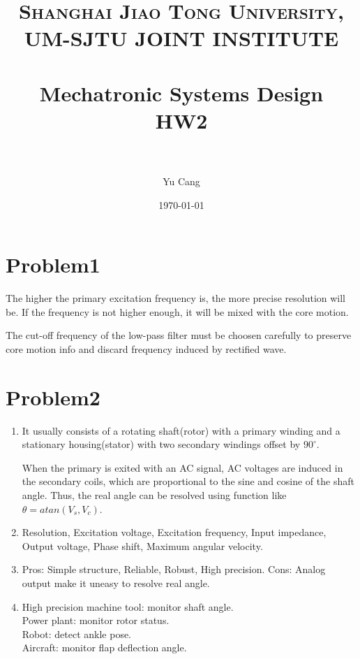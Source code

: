 \documentclass[paper=a4, fontsize=11pt]{scrartcl} %
\title{	
\normalfont \normalsize 
\textsc{Shanghai Jiao Tong University, UM-SJTU JOINT INSTITUTE} \\ [25pt] %
\horrule{0.5pt} \\[0.4cm] %
\huge Mechatronic Systems Design\\ HW2 \\ %
\horrule{2pt} \\[0.5cm] %
}
\author{Yu Cang \quad 018370210001} %
\date{\normalsize \today} %
\numberwithin{equation}{section} %
\numberwithin{figure}{section} %
\numberwithin{table}{section} %
\begin{document}
\maketitle %

\section*{Problem1}
	The higher the primary excitation frequency is, the more precise resolution will be. If the frequency is not higher enough, it will be mixed with the core motion.\newline
	
	The cut-off frequency of the low-pass filter must be choosen carefully to preserve core motion info and discard frequency induced by rectified wave.

\section*{Problem2}
	\begin{enumerate}
		\item 
			It usually consists of a rotating shaft(rotor) with a primary winding and a stationary housing(stator) with two secondary windings offset by $90^\circ$. \newline
			
			When the primary is exited with an AC signal, AC voltages are induced in the secondary coils, which are proportional to the sine and cosine of the shaft angle. Thus, the real angle can be resolved using function like $\theta = atan(V_s, V_c)$.
			
		\item 
			Resolution, Excitation voltage, Excitation frequency, Input impedance, Output voltage, Phase shift, Maximum angular velocity.
		\item 
			Pros: Simple structure, Reliable, Robust, High precision.\newline
			Cons: Analog output make it uneasy to resolve real angle.
		
		\item 
			High precision machine tool: monitor shaft angle.\\
			Power plant: monitor rotor status.\\
			Robot: detect ankle pose.\\
			Aircraft: monitor flap deflection angle.
			
		
	\end{enumerate}
\end{document}
